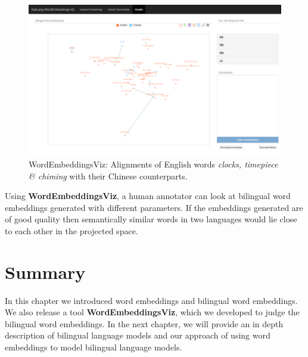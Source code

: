 \begin{figure}[htbp]
	\begin{center}
		\includegraphics[width=\textwidth]{files/images/viz4}
	\end{center}
	\caption{WordEmbeddingsViz: Alignments of English words \textit{clocks, timepiece \& chiming} with their Chinese counterparts.}
	\label{fig:viz4}
\end{figure}

Using \textbf{WordEmbeddingsViz}, a human annotator can look at bilingual word embeddings generated with different parameters. If the embeddings generated are of good quality then semantically similar words in two languages would lie close to each other in the projected space.

\section{Summary}
In this chapter we introduced word embeddings and bilingual word embeddings. We also release a tool \textbf{WordEmbeddingsViz}, which we developed to judge the bilingual word embeddings. In the next chapter, we will provide an in depth description of bilingual language models and our approach of using word embeddings to model bilingual language models.